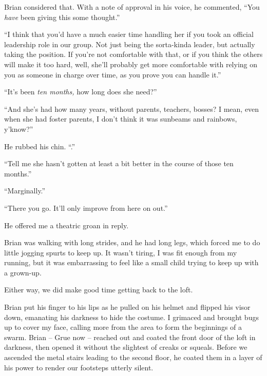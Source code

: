 Brian considered that.  With a note of approval in his voice, he commented, ``You \emph{have} been giving this some thought.''



``I think that you'd have a much easier time handling her if you took an official leadership role in our group.  Not just being the sorta-kinda leader, but actually taking the position.  If you're not comfortable with that, or if you think the others will make it too hard, well, she'll probably get more comfortable with relying on you as someone in charge over time, as you prove you can handle it.''



``It's been \emph{ten months, }how long does she need?''



``And she's had how many years, without parents, teachers, bosses?  I mean, even when she had foster parents, I don't think it was sunbeams and rainbows, y'know?''



He rubbed his chin.  ``\ldotsYeah.''



``Tell me she hasn't gotten at least a bit better in the course of those ten months.''



``Marginally.''



``There you go.  It'll only improve from here on out.''



He offered me a theatric groan in reply.



Brian was walking with long strides, and he had long legs, which forced me to do little jogging spurts to keep up.  It wasn't tiring, I was fit enough from my running, but it was embarrassing to feel like a small child trying to keep up with a grown-up.



Either way, we did make good time getting back to the loft.



Brian put his finger to his lips as he pulled on his helmet and flipped his visor down, emanating his darkness to hide the costume.  I grimaced and brought bugs up to cover my face, calling more from the area to form the beginnings of a swarm.  Brian – Grue now – reached out and coated the front door of the loft in darkness, then opened it without the slightest of creaks or squeals.  Before we ascended the metal stairs leading to the second floor, he coated them in a layer of his power to render our footsteps utterly silent.



